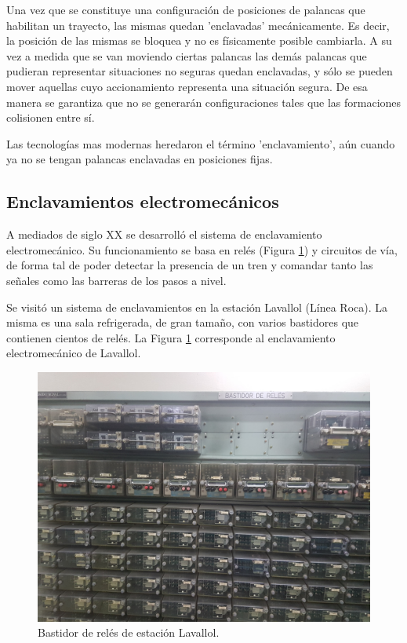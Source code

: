 			Una vez que se constituye una configuración de posiciones de palancas que habilitan un trayecto, las mismas quedan 'enclavadas' mecánicamente. Es decir, la posición de las mismas se bloquea y no es físicamente posible cambiarla. A su vez a medida que se van moviendo ciertas palancas las demás palancas que pudieran representar situaciones no seguras quedan enclavadas, y sólo se pueden mover aquellas cuyo accionamiento representa una situación segura. De esa manera se garantiza que no se generarán configuraciones tales que las formaciones colisionen entre sí.
			
			Las tecnologías mas modernas heredaron el término 'enclavamiento', aún cuando ya no se tengan palancas enclavadas en posiciones fijas.
		
		\subsection{Enclavamientos electromecánicos}
			
			A mediados de siglo XX se desarrolló el sistema de enclavamiento electromecánico. Su funcionamiento se basa en relés (Figura \ref{fig:Reles}) y circuitos de vía, de forma tal de poder detectar la presencia de un tren y comandar tanto las señales como las barreras de los pasos a nivel.
	
			Se visitó un sistema de enclavamientos en la estación Lavallol (Línea Roca). La misma es una sala refrigerada, de gran tamaño, con varios bastidores que contienen cientos de relés. La Figura \ref{fig:Reles} corresponde al enclavamiento electromecánico de Lavallol.	
			
			\begin{figure}[htbp!]
				\centering
				\includegraphics[scale=.08]{./Figures/Reles}
				\caption{Bastidor de relés de estación Lavallol.}
				\label{fig:Reles}
			\end{figure}
		
